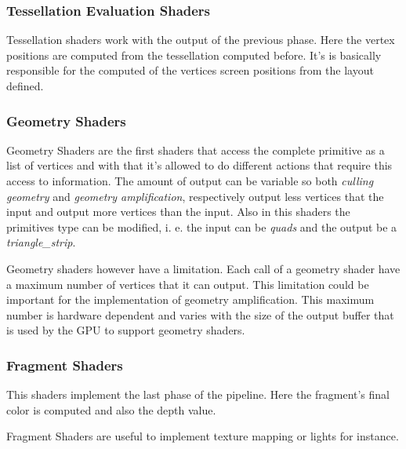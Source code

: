 

\subsubsection{Tessellation Evaluation Shaders} %
\label{ssub:tesselation_evaluation_shaders}
Tessellation shaders work with the output of the previous phase. Here the vertex positions are computed from the tessellation computed before. It's is basically responsible for the computed of the vertices screen positions from the layout defined.



\subsubsection{Geometry Shaders} %
\label{sub:geometriy_shaders}

Geometry Shaders are the first shaders that access the complete primitive as a list of vertices and with that it's allowed to do different actions that require this access to information. The amount of output can be variable so both \emph{culling geometry} and \emph{geometry amplification}, respectively output less vertices that the input and output more vertices than the input. Also in this shaders the primitives type can be modified, i. e. the input can be \emph{quads} and the output be a \emph{triangle\_strip}.

Geometry shaders however have a limitation. Each call of a geometry shader have a maximum number of vertices that it can output. This limitation could be important for the implementation of geometry amplification. This maximum number is hardware dependent and varies with the size of the output buffer that is used by the GPU to support geometry shaders.


\subsubsection{Fragment Shaders} %
\label{sub:fragment_shaders}
This shaders implement the last phase of the pipeline. Here the fragment's final color is computed and also the depth value.

Fragment Shaders are useful to implement texture mapping or lights for instance.

